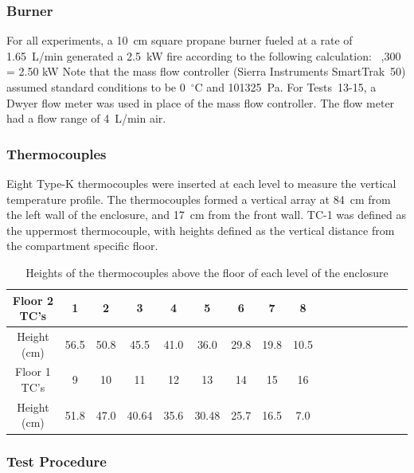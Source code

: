 \subsubsection{Burner}

For all experiments, a 10~cm square propane burner fueled at a rate of 1.65~L/min generated a 2.5~kW fire according to the following calculation:
  \times {}  \times {}   \,  ,300 \,  = 2.50 \; {\rm kW}
\label{Conversion_Equation}
\ee
Note that the mass flow controller (Sierra Instruments SmartTrak~50) assumed standard conditions to be 0~$^\circ$C and 101325~Pa. For Tests~13-15, a Dwyer flow meter was used in place of the mass flow controller. The flow meter had a flow range of 4~L/min air.

\subsubsection{Thermocouples}

Eight Type-K thermocouples were inserted at each level to measure the vertical temperature profile. The thermocouples formed a vertical array at 84~cm from the left wall of the enclosure, and 17~cm from the front wall. TC-1 was defined as the uppermost thermocouple, with heights defined as the vertical distance from the compartment specific floor.

\begin{table}[h!]
\caption{Heights of the thermocouples above the floor of each level of the enclosure}
\begin{center}
\begin{tabular}{|c|c|c|c|c|c|c|c|c|c|c|c|c|c|c|c|c|}
\hline
Floor 2 TC's   & 1& 2& 3 & 4& 5& 6& 7&8\\ \hline
Height (cm) & 56.5& 50.8& 45.5& 41.0& 36.0& 29.8& 19.8& 10.5\\ \hline
Floor 1 TC's & 9&10&11&12&13&14&15&16\\ \hline
Height (cm) &51.8&47.0&40.64&35.6&30.48&25.7& 16.5&7.0\\ \hline


\end{tabular}
\end{center}
\label{Tab.TC}
\end{table}

\subsubsection{Test Procedure}

